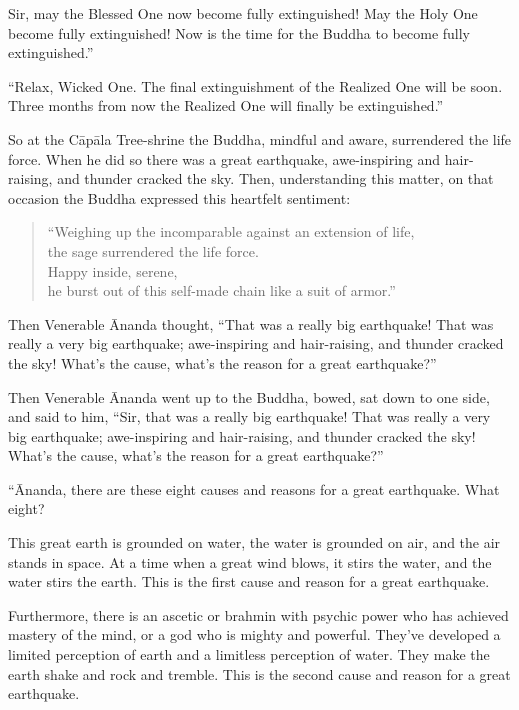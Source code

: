 \documentclass[12pt,openany]{book}%
\begin{document}
Sir, may the Blessed One now become fully extinguished! May the Holy One become fully extinguished! Now is the time for the Buddha to become fully extinguished.” 

“Relax, Wicked One. The final extinguishment of the Realized One will be soon. Three months from now the Realized One will finally be extinguished.” 

So at the \textsanskrit{Cāpāla} Tree-shrine the Buddha, mindful and aware, surrendered the life force. When he did so there was a great earthquake, awe-inspiring and hair-raising, and thunder cracked the sky. Then, understanding this matter, on that occasion the Buddha expressed this heartfelt sentiment: 

\begin{verse}%
“Weighing up the incomparable against an extension of life, \\
the sage surrendered the life force. \\
Happy inside, serene, \\
he burst out of this self-made chain like a suit of armor.” 

%
\end{verse}

Then Venerable Ānanda thought, “That was a really big earthquake! That was really a very big earthquake; awe-inspiring and hair-raising, and thunder cracked the sky! What’s the cause, what’s the reason for a great earthquake?” 

Then Venerable Ānanda went up to the Buddha, bowed, sat down to one side, and said to him, “Sir, that was a really big earthquake! That was really a very big earthquake; awe-inspiring and hair-raising, and thunder cracked the sky! What’s the cause, what’s the reason for a great earthquake?” 

“Ānanda, there are these eight causes and reasons for a great earthquake. What eight? 

This great earth is grounded on water, the water is grounded on air, and the air stands in space. At a time when a great wind blows, it stirs the water, and the water stirs the earth. This is the first cause and reason for a great earthquake. 

Furthermore, there is an ascetic or brahmin with psychic power who has achieved mastery of the mind, or a god who is mighty and powerful. They’ve developed a limited perception of earth and a limitless perception of water. They make the earth shake and rock and tremble. This is the second cause and reason for a great earthquake. 
\end{document}
